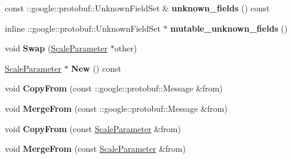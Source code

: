 \begin{DoxyCompactItemize}
\item 
\mbox{\label{classcaffe_1_1_scale_parameter_a8a1df1b4ac305494e145fe280e4a786f}} 
const \+::google\+::protobuf\+::\+Unknown\+Field\+Set \& {\bfseries unknown\+\_\+fields} () const
\item 
\mbox{\label{classcaffe_1_1_scale_parameter_a90f131a391fac8366b915a7c052d00f9}} 
inline \+::google\+::protobuf\+::\+Unknown\+Field\+Set $\ast$ {\bfseries mutable\+\_\+unknown\+\_\+fields} ()
\item 
\mbox{\label{classcaffe_1_1_scale_parameter_ac52b11df8faa8cd29b5da548a6a58303}} 
void {\bfseries Swap} (\mbox{\hyperlink{classcaffe_1_1_scale_parameter}{Scale\+Parameter}} $\ast$other)
\item 
\mbox{\label{classcaffe_1_1_scale_parameter_aac45fb64a2d53a191b1c8fa72764d5f8}} 
\mbox{\hyperlink{classcaffe_1_1_scale_parameter}{Scale\+Parameter}} $\ast$ {\bfseries New} () const
\item 
\mbox{\label{classcaffe_1_1_scale_parameter_a31ba52c4e6938ae1c5c64b50c1fb340b}} 
void {\bfseries Copy\+From} (const \+::google\+::protobuf\+::\+Message \&from)
\item 
\mbox{\label{classcaffe_1_1_scale_parameter_a6bcd86c367ee2d8cf9c8d33083b34490}} 
void {\bfseries Merge\+From} (const \+::google\+::protobuf\+::\+Message \&from)
\item 
\mbox{\label{classcaffe_1_1_scale_parameter_a6b4f4731f5f3797d95c583e596e9f783}} 
void {\bfseries Copy\+From} (const \mbox{\hyperlink{classcaffe_1_1_scale_parameter}{Scale\+Parameter}} \&from)
\item 
\mbox{\label{classcaffe_1_1_scale_parameter_a92d46fc8e5cde3edcf1e5a4457078080}} 
void {\bfseries Merge\+From} (const \mbox{\hyperlink{classcaffe_1_1_scale_parameter}{Scale\+Parameter}} \&from)
\item 
\mbox{\label{classcaffe_1_1_scale_parameter_aacc2f0598cee6972468e1ce489724259}} 

\end{DoxyCompactItemize}

